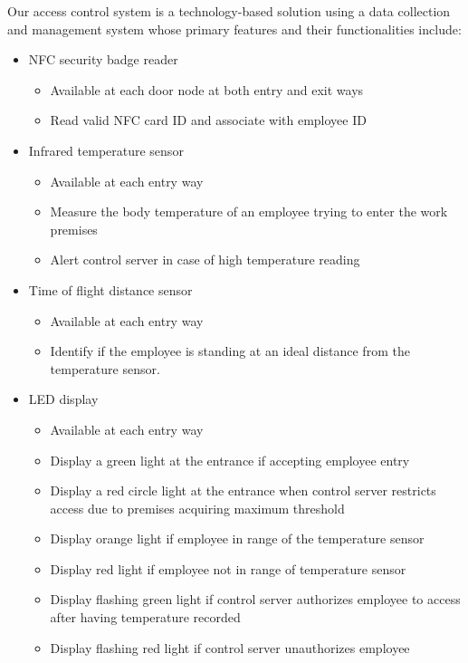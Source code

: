 Our access control system is a technology-based solution using a data collection
and management system whose primary features and their functionalities include: 
\begin{itemize}
    \item NFC security badge reader
    \begin{itemize}
        \item Available at each door node at both entry and exit ways
        \item Read valid NFC card ID and associate with employee ID
    \end{itemize}
    \item Infrared temperature sensor
    \begin{itemize}
        \item Available at each entry way
        \item Measure the body temperature of an employee trying to enter the
              work premises
        \item Alert control server in case of high temperature reading
    \end{itemize}
    \item Time of flight distance sensor
    \begin{itemize}
        \item Available at each entry way
        \item Identify if the employee is standing at an ideal distance from the
              temperature sensor.
    \end{itemize}
    \item LED display
    \begin{itemize}
        \item Available at each entry way
        \item Display a green light at the entrance if accepting employee entry
        \item Display a red circle light at the entrance when control server
              restricts access due to premises acquiring maximum threshold
        \item Display orange light if employee in range of the temperature
              sensor
        \item Display red light if employee not in range of temperature sensor
        \item Display flashing green light if control server authorizes employee
              to access after having temperature recorded
        \item Display flashing red light if control server unauthorizes employee

\end{itemize}
\end{itemize}
